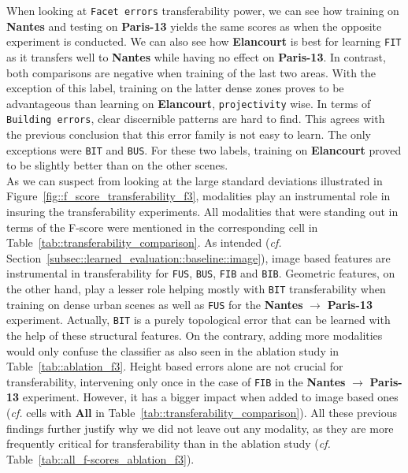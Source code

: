         When looking at \texttt{Facet errors} transferability power, we can see how training on \textbf{Nantes} and testing on \textbf{Paris-13} yields the same scores as when the opposite experiment is conducted.
        We can also see how \textbf{Elancourt} is best for learning \texttt{FIT} as it transfers well to \textbf{Nantes} while having no effect on \textbf{Paris-13}.
        In contrast, both comparisons are negative when training of the last two areas.
        With the exception of this label, training on the latter dense zones proves to be advantageous than learning on \textbf{Elancourt}, \texttt{projectivity} wise.
        In terms of \texttt{Building errors}, clear discernible patterns are hard to find.
        This agrees with the previous conclusion that this error family is not easy to learn.
        The only exceptions were \texttt{BIT} and \texttt{BUS}.
        For these two labels, training on \textbf{Elancourt} proved to be slightly better than on the other scenes.\\

        As we can suspect from looking at the large standard deviations illustrated in Figure~\ref{fig::f_score_transferability_f3}, modalities play an instrumental role in insuring the transferability experiments.
        All modalities that were standing out in terms of the F-score were mentioned in the corresponding cell in Table~\ref{tab::transferability_comparison}.
        As intended (\textit{cf.} Section~\ref{subsec::learned_evaluation::baseline::image}), image based features are instrumental in transferability for \texttt{FUS}, \texttt{BUS}, \texttt{FIB} and \texttt{BIB}.
        Geometric features, on the other hand, play a lesser role helping mostly with \texttt{BIT} transferability when training on dense urban scenes as well as \texttt{FUS} for the \textbf{Nantes} \(\rightarrow\) \textbf{Paris-13} experiment.
        Actually, \texttt{BIT} is a purely topological error that can be learned with the help of these structural features.
        On the contrary, adding more modalities would only confuse the classifier as also seen in the ablation study in Table~\ref{tab::ablation_f3}.
        Height based errors alone are not crucial for transferability, intervening only once in the case of \texttt{FIB} in the \textbf{Nantes} \(\rightarrow\) \textbf{Paris-13} experiment.
        However, it has a bigger impact when added to image based ones (\textit{cf.} cells with \textbf{All} in Table~\ref{tab::transferability_comparison}).
        All these previous findings further justify why we did not leave out any modality, as they are more frequently critical for transferability than in the ablation study (\textit{cf.} Table~\ref{tab::all_f-scores_ablation_f3}).\\

